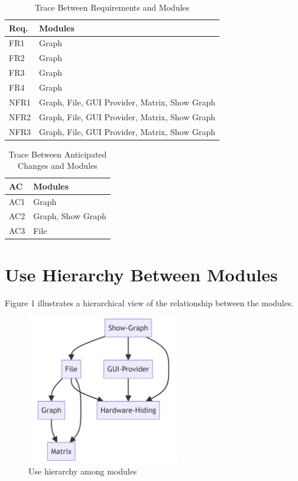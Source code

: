 \documentclass[12pt, titlepage]{article}
\begin{document}
\begin{table}[H]
\centering
\begin{tabular}{p{} p{}}
\toprule
\textbf{Req.} & \textbf{Modules}\\
\midrule
FR1 & Graph \\
FR2 & Graph\\
FR3 & Graph\\
FR4 & Graph\\
NFR1 & Graph, File, GUI Provider, Matrix, Show Graph\\
NFR2 & Graph, File, GUI Provider, Matrix, Show Graph\\
NFR3 & Graph, File, GUI Provider, Matrix, Show Graph\\
\bottomrule
\end{tabular}
\caption{Trace Between Requirements and Modules}
\label{TblRT}
\end{table}

\begin{table}[H]
\centering
\begin{tabular}{p{} p{}}
\toprule
\textbf{AC} & \textbf{Modules}\\
\midrule
AC1 & Graph\\
AC2 &Graph, Show Graph\\
AC3 & File\\
\bottomrule
\end{tabular}
\caption{Trace Between Anticipated Changes and Modules}
\label{TblACT}
\end{table}

\section{Use Hierarchy Between Modules} \label{SecUse}

Figure 1 illustrates a hierarchical view of the relationship between the modules.
\begin{figure}[h!]
\begin{center}
 \includegraphics[width=0.6\textwidth]{GRAPH}
\caption{Use hierarchy among modules}
\label{Fig_SystemContext} 
\end{center}
\end{figure}
\end{document}
